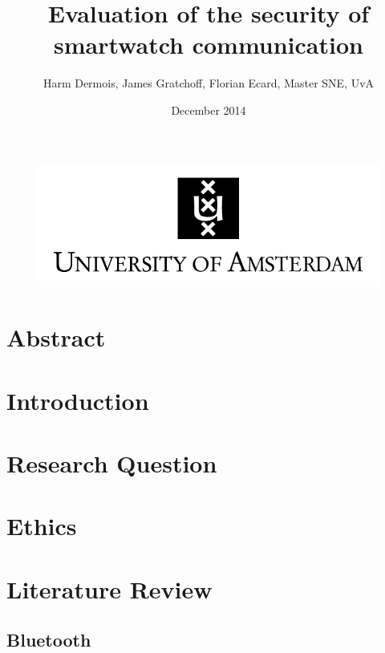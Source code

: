 \documentclass{article}
\begin{document}
 

\begin{figure}[!h]
 	\begin{center}
		\huge \title{Evaluation of the security of smartwatch communication}
		\author{Harm Dermois, James Gratchoff, Florian Ecard,  Master SNE, UvA} 
		\date{December 2014\\}
	\maketitle 
		\includegraphics{uva.jpeg}
		\label{sec:uva}
	\end{center}
\end{figure}

\newpage

\section*{Abstract}

\newpage

\tableofcontents

\newpage

\section{Introduction}
\newpage
\section{Research Question}
\section{Ethics} %

\newpage
\section{Literature Review}

	\subsection{Bluetooth}
\end{document}
